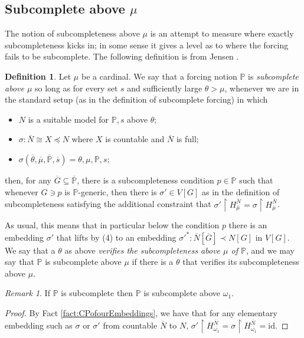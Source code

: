 \documentclass{amsart}
\theoremstyle{definition}
\newtheorem{definition}[theorem]{Definition}
\theoremstyle{remark}
\newtheorem{remark}[theorem]{Remark}
\renewcommand{\P}{\mathbb{P}}
\newcommand{\N}{{\overline{N}}}
\newcommand{\G}{\overline{G}}
\newcommand{\rest}{\mathbin{\upharpoonright}}
\begin{document}
\subsection{Subcomplete above $\mu$} \label{subsec:subcompleteabovemu}
The notion of subcompleteness above $\mu$ is an attempt to measure where exactly subcompleteness kicks in; in some sense it gives a level as to where the forcing fails to be subcomplete. 
The following definition is from Jensen \cite[Ch.~2 p.\ 47]{Jensen:2009fe}.
\begin{definition} 
Let $\mu$ be a cardinal. We say that a forcing notion $\P$ is \emph{subcomplete above $\mu$} so long as for every set $s$ and sufficiently large $\theta > \mu$, whenever we are in the standard setup (as in the definition of subcomplete forcing) in which \begin{itemize}
	\item $N$ is a suitable model for $\P, s$ above $\theta$;
	\item $\sigma:\N \cong X \preccurlyeq N$ where $X$ is countable and $\N$ is full;
	\item $\sigma(\overline{\theta}, \overline{\mu}, \overline{\P}, \overline s)=\theta, \mu, \P, s$;
\end{itemize}	
then, for any $\G \subseteq \overline{\P}$, there is a subcompleteness condition $p \in \P$ such that whenever $G \ni p$ is $\P$-generic, then there is $\sigma' \in V[G]$ as in the definition of subcompleteness satisfying the additional constraint that $\sigma' \rest H_{\overline \mu}^{\N} = \sigma \rest H_{\overline \mu}^{\N}$.

As usual, this means that in particular below the condition $p$ there is an embedding $\sigma'$ that lifts by (4) to an embedding $\sigma'^*:\N[\G] \prec N[G]$ in $V[G]$. We say that a $\theta$ as above \textit{verifies the subcompleteness above $\mu$ of $\P$}, and we may say that $\P$ is subcomplete above \(\mu\) if there is a $\theta$ that verifies its subcompleteness above $\mu$.
\end{definition}

\begin{remark} \label{remark:scaboveomega1} If $\P$ is subcomplete then $\P$ is subcomplete above $\omega_1$. \end{remark}
\begin{proof} By Fact \ref{fact:CPofourEmbeddings}, we have that for any elementary embedding such as $\sigma$ or $\sigma'$ from countable $\N$ to $N$, $\sigma' \rest H_{\overline{\omega_1}}^{\N} = \sigma \rest H_{\overline{\omega_1}}^{\N} = \text{id}$. \end{proof}
\end{document}
